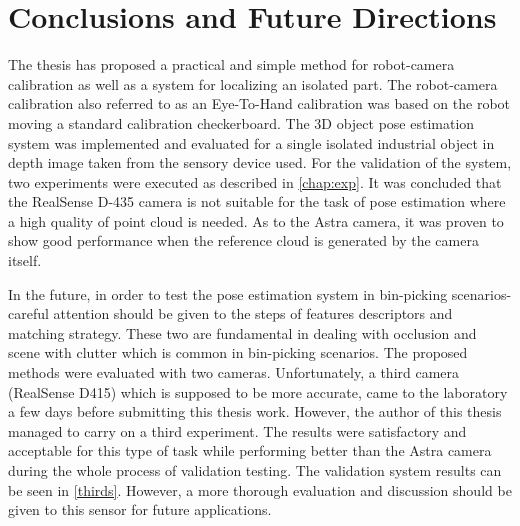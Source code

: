 \chapter{Conclusions and Future Directions}
\label{chap:con}

The thesis has proposed a practical and simple method for robot-camera calibration as well as a system for localizing an isolated part. The robot-camera calibration also referred to as an Eye-To-Hand calibration was based on the robot moving a standard calibration checkerboard. The 3D object pose estimation system was implemented and evaluated for a single isolated industrial object in depth image taken from the sensory device used. For the validation of the system, two experiments were executed as described in \ref{chap:exp}. It was concluded that the RealSense D-435 camera is not suitable for the task of pose estimation where a high quality of point cloud is needed. As to the Astra camera, it was proven to show good performance when the reference cloud is generated by the camera itself.

In the future, in order to test the pose estimation system in bin-picking scenarios-careful attention should be given to the steps of features descriptors and matching strategy. These two are fundamental in dealing with occlusion and scene with clutter which is common in bin-picking scenarios. The proposed methods were evaluated with two cameras. Unfortunately, a third camera (RealSense D415) which is supposed to be more accurate, came to the laboratory a few days before submitting this thesis work. However, the author of this thesis managed to carry on a third experiment. The results were satisfactory and acceptable for this type of task while performing better than the Astra camera during the whole process of validation testing. The validation system results can be seen in \ref{thirds}. However, a more thorough evaluation and discussion should be given to this sensor for future applications.  




